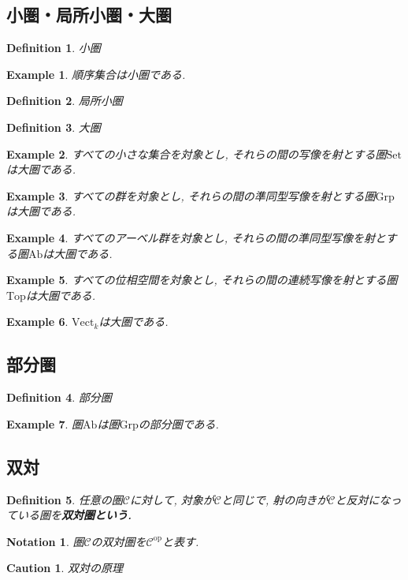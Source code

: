 \documentclass{jsbook}
\theoremstyle{plain}
\newtheorem{Def}{Definition}[chapter]
\newtheorem{Notation}{Notation}[chapter]
\newtheorem{caution}{Caution}[chapter]
\newtheorem{example}{Example}[chapter]
\begin{document}
\subsection{小圏・局所小圏・大圏}
\begin{Def}
小圏
\end{Def}
\begin{example}
順序集合は小圏である.
\end{example}
\begin{Def}
局所小圏
\end{Def}
\begin{Def}
大圏
\end{Def}

\begin{example}
すべての小さな集合を対象とし, それらの間の写像を射とする圏$\mathrm{Set}$は大圏である.
\end{example}
\begin{example}
すべての群を対象とし, それらの間の準同型写像を射とする圏$\mathrm{Grp}$は大圏である.
\end{example}
\begin{example}
すべてのアーベル群を対象とし, それらの間の準同型写像を射とする圏$\mathrm{Ab}$は大圏である.
\end{example}
\begin{example}
すべての位相空間を対象とし, それらの間の連続写像を射とする圏$\mathrm{Top}$は大圏である.
\end{example}
\begin{example}
$\mathrm{Vect}_k$は大圏である.
\end{example}
\subsection{部分圏}
\begin{Def}
部分圏
\end{Def}
\begin{example}
圏$\mathrm{Ab}$は圏$\mathrm{Grp}$の部分圏である.
\end{example}
\subsection{双対}
\begin{Def}
任意の圏$\mathscr{C}$に対して, 対象が$\mathscr{C}$と同じで, 射の向きが$\mathcal{C}$と反対になっている圏を\bf{双対圏}という.
\end{Def}
\begin{Notation}
圏$\mathscr{C}$の双対圏を$\mathscr{C}^{\mathrm{op}}$と表す.
\end{Notation}
\begin{caution}
双対の原理
\end{caution}
\end{document}
